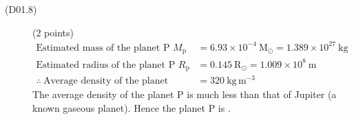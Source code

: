 \begin{description}
\item[(D01.8)] \hfill(2 points)
\begin{align*}
\text{Estimated mass of the planet P }
  M_{\mathrm{p}} &= 6.93\times10^{-4}\ \mathrm{M_\odot}
  = 1.389\times10^{27}\ \mathrm{kg}\\
\text{Estimated radius of the planet P }
  R_{\mathrm{p}} &= 0.145\ \mathrm{R_\odot} = 1.009\times10^{8}\ \mathrm{m}\\
\therefore\ \text{Average density of the planet} &= 320\ \mathrm{kg\,m^{-3}}
\end{align*}
The average density of the planet P is much less than that of Jupiter (a
known gaseous planet). Hence the planet P is .
\end{description}
